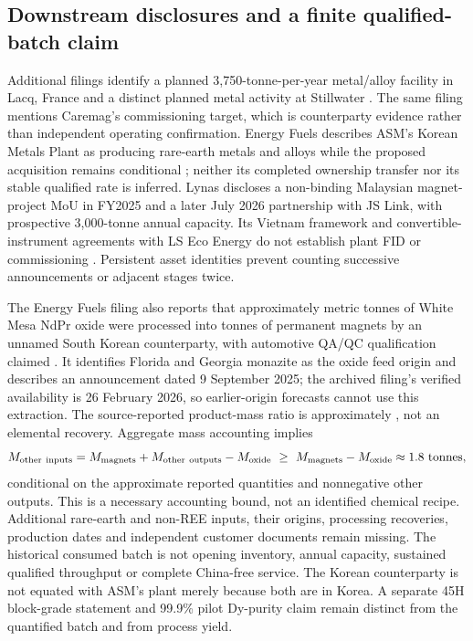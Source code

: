 \documentclass[11pt]{article}
\begin{document}
\subsection{Downstream disclosures and a finite qualified-batch claim}
Additional filings identify a planned 3,750-tonne-per-year metal/alloy facility in Lacq, France and a distinct planned metal activity at Stillwater \citep{USARE2025}. The same filing mentions Caremag's commissioning target, which is counterparty evidence rather than independent operating confirmation. Energy Fuels describes ASM's Korean Metals Plant as producing rare-earth metals and alloys while the proposed acquisition remains conditional \citep{EF2025}; neither its completed ownership transfer nor its stable qualified rate is inferred. Lynas discloses a non-binding Malaysian magnet-project MoU in FY2025 and a later July 2026 partnership with JS Link, with prospective 3,000-tonne annual capacity. Its Vietnam framework and convertible-instrument agreements with LS Eco Energy do not establish plant FID or commissioning \citep{Lynas2025,Lynas2026}. Persistent asset identities prevent counting successive announcements or adjacent stages twice.

The Energy Fuels filing also reports that approximately \BatchOxideInput{} metric tonnes of White Mesa NdPr oxide were processed into \BatchMagnetOutput{} tonnes of permanent magnets by an unnamed South Korean counterparty, with automotive QA/QC qualification claimed \citep{EF2025}. It identifies Florida and Georgia monazite as the oxide feed origin and describes an announcement dated 9 September 2025; the archived filing's verified availability is 26 February 2026, so earlier-origin forecasts cannot use this extraction. The source-reported product-mass ratio is approximately \BatchProductRatio{}, not an elemental recovery. Aggregate mass accounting implies
\begin{equation}
M_{\mathrm{other\ inputs}}=M_{\mathrm{magnets}}+M_{\mathrm{other\ outputs}}-M_{\mathrm{oxide}}
\ \geq\ M_{\mathrm{magnets}}-M_{\mathrm{oxide}}\approx\BatchAdditionalInput{}\ \mathrm{tonnes},
\end{equation}
conditional on the approximate reported quantities and nonnegative other outputs. This is a necessary accounting bound, not an identified chemical recipe. Additional rare-earth and non-REE inputs, their origins, processing recoveries, production dates and independent customer documents remain missing. The historical consumed batch is not opening inventory, annual capacity, sustained qualified throughput or complete China-free service. The Korean counterparty is not equated with ASM's plant merely because both are in Korea. A separate 45H block-grade statement and 99.9\% pilot Dy-purity claim remain distinct from the quantified batch and from process yield.
\end{document}
